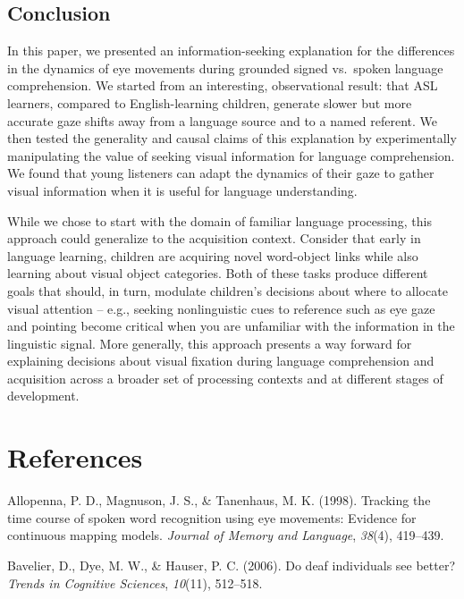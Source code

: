 \documentclass[,man,floatsintext]{apa6}
\begin{document}
\subsection{Conclusion}\label{conclusion}

In this paper, we presented an information-seeking explanation for the
differences in the dynamics of eye movements during grounded signed
vs.~spoken language comprehension. We started from an interesting,
observational result: that ASL learners, compared to English-learning
children, generate slower but more accurate gaze shifts away from a
language source and to a named referent. We then tested the generality
and causal claims of this explanation by experimentally manipulating the
value of seeking visual information for language comprehension. We found
that young listeners can adapt the dynamics of their gaze to gather
visual information when it is useful for language understanding.

While we chose to start with the domain of familiar language processing,
this approach could generalize to the acquisition context. Consider that
early in language learning, children are acquiring novel word-object
links while also learning about visual object categories. Both of these
tasks produce different goals that should, in turn, modulate children's
decisions about where to allocate visual attention -- e.g., seeking
nonlinguistic cues to reference such as eye gaze and pointing become
critical when you are unfamiliar with the information in the linguistic
signal. More generally, this approach presents a way forward for
explaining decisions about visual fixation during language comprehension
and acquisition across a broader set of processing contexts and at
different stages of development.

\newpage

\section{References}\label{references}

\setlength{\parindent}{-0.5in} \setlength{\leftskip}{0.5in}

\hypertarget{refs}{}
\hypertarget{ref-allopenna1998tracking}{}
Allopenna, P. D., Magnuson, J. S., \& Tanenhaus, M. K. (1998). Tracking
the time course of spoken word recognition using eye movements: Evidence
for continuous mapping models. \emph{Journal of Memory and Language},
\emph{38}(4), 419--439.

\hypertarget{ref-bavelier2006deaf}{}
Bavelier, D., Dye, M. W., \& Hauser, P. C. (2006). Do deaf individuals
see better? \emph{Trends in Cognitive Sciences}, \emph{10}(11),
512--518.
\end{document}
